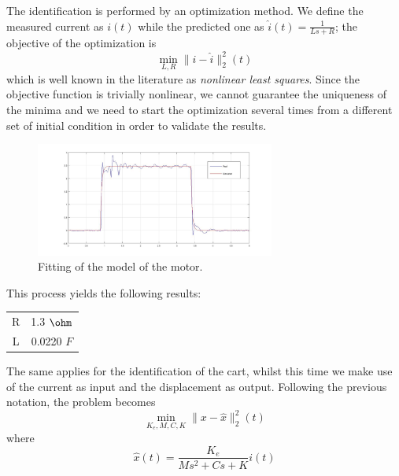 The identification is performed by an optimization method. We define the measured current as $i(t)$ while the predicted one as $\hat{i}(t) = \frac{1}{Ls+R}$; the objective of the optimization is
\begin{equation}
\min_{L,R} \|i-\hat{i}\|_2^2(t)
\end{equation}
which is well known in the literature as \emph{nonlinear least squares}. Since the objective function is trivially nonlinear, we cannot guarantee the uniqueness of the minima and we need to start the optimization several times from a different set of initial condition in order to validate the results.
\begin{figure}[h]
\includegraphics[width=0.7\textwidth]{img/graybox_motor.jpg}
\caption{Fitting of the model of the motor.}
\end{figure}

This process yields the following results:
\begin{table}
\centering
\begin{tabular}{|c|c|}
R & 1.3 $\ohm$ \\
L & 0.0220 $F$ \\
\end{tabular}
\end{table}

The same applies for the identification of the cart, whilst this time we make use of the current as input and the displacement as output. Following the previous notation, the problem becomes
\begin{equation}
\min_{K_e,M,C,K} \|x-\hat{x}\|_2^2(t)
\end{equation}
where
\begin{equation}
\hat{x}(t) = \frac{K_e}{Ms^2+Cs+K} i(t)
\end{equation}

